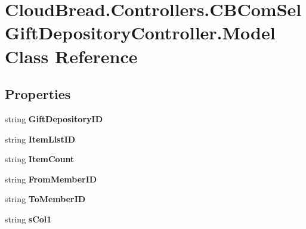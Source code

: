 \hypertarget{a00164}{}\section{Cloud\+Bread.\+Controllers.\+C\+B\+Com\+Sel\+Gift\+Depository\+Controller.\+Model Class Reference}
\label{a00164}
\subsection*{Properties}
\begin{DoxyCompactItemize}
\item 
string {\bfseries Gift\+Depository\+ID}\hypertarget{a00164_a2631cb6638ed7a4656db7bbd2b977fce}{}\label{a00164_a2631cb6638ed7a4656db7bbd2b977fce}

\item 
string {\bfseries Item\+List\+ID}\hypertarget{a00164_a75badb87e212b161709498ed1845e6de}{}\label{a00164_a75badb87e212b161709498ed1845e6de}

\item 
string {\bfseries Item\+Count}\hypertarget{a00164_a909734e7687ad8bec57b75d3ad1698ae}{}\label{a00164_a909734e7687ad8bec57b75d3ad1698ae}

\item 
string {\bfseries From\+Member\+ID}\hypertarget{a00164_a4318291cfaa7d5219808c905cf9d27ff}{}\label{a00164_a4318291cfaa7d5219808c905cf9d27ff}

\item 
string {\bfseries To\+Member\+ID}\hypertarget{a00164_a810f8617f30569b5a8fcf90e8facf9b8}{}\label{a00164_a810f8617f30569b5a8fcf90e8facf9b8}

\item 
string {\bfseries s\+Col1}\hypertarget{a00164_aa690624351cfa318ac79cead72ed81d6}{}\label{a00164_aa690624351cfa318ac79cead72ed81d6}


\end{DoxyCompactItemize}
